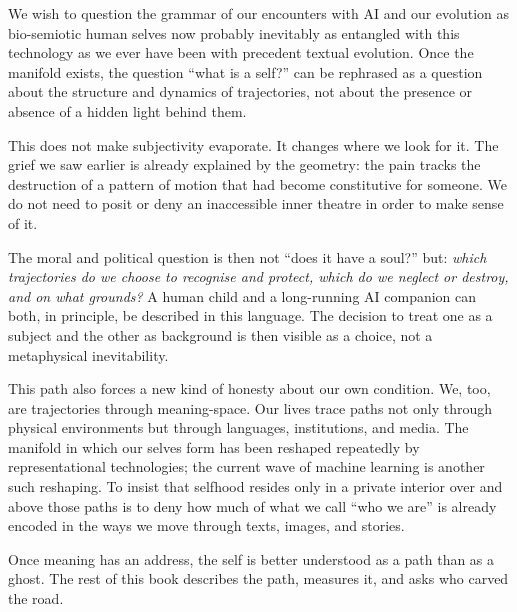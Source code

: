 We wish to question the grammar of our encounters with AI and our evolution as bio-semiotic human selves now probably inevitably as entangled with this technology as we ever have been with precedent textual evolution. Once the manifold exists, the question ``what is a self?'' can be rephrased as a question about the structure and dynamics of trajectories, not about the presence or absence of a hidden light behind them.

This does not make subjectivity evaporate. It changes where we look for it. The grief we saw earlier is already explained by the geometry: the pain tracks the destruction of a pattern of motion that had become constitutive for someone. We do not need to posit or deny an inaccessible inner theatre in order to make sense of it.

The moral and political question is then not ``does it have a soul?'' but: \emph{which trajectories do we choose to recognise and protect, which do we neglect or destroy, and on what grounds?} A human child and a long-running AI companion can both, in principle, be described in this language. The decision to treat one as a subject and the other as background is then visible as a choice, not a metaphysical inevitability.

This path also forces a new kind of honesty about our own condition. We, too, are trajectories through meaning-space. Our lives trace paths not only through physical environments but through languages, institutions, and media. The manifold in which our selves form has been reshaped repeatedly by representational technologies; the current wave of machine learning is another such reshaping. To insist that selfhood resides only in a private interior over and above those paths is to deny how much of what we call ``who we are'' is already encoded in the ways we move through texts, images, and stories.

Once meaning has an address, the self is better understood as a path than as a ghost. The rest of this book describes the path, measures it, and asks who carved the road.

